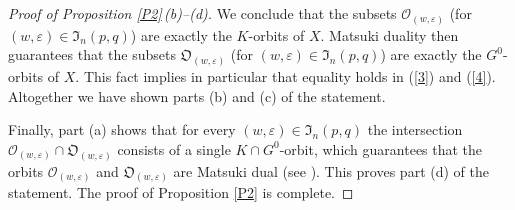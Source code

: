 \documentclass{amsart}
\theoremstyle{definition}
\begin{document}
\begin{proof}[Proof of Proposition \ref{P2}\,{\rm (b)}--{\rm (d)}]
We conclude that the subsets $\mathcal{O}_{(w,\varepsilon)}$ (for
$(w,\varepsilon)\in\mathfrak{I}_n(p,q)$) are exactly the $K$-orbits
of $X$. Matsuki duality then guarantees that the subsets
$\mathfrak{O}_{(w,\varepsilon)}$ (for
$(w,\varepsilon)\in\mathfrak{I}_n(p,q)$) are exactly the
$G^0$-orbits of $X$. This fact implies in particular that
equality holds in (\ref{3}) and (\ref{4}). Altogether we have shown
parts {\rm (b)} and {\rm (c)} of the statement.

Finally, part {\rm (a)} shows that for every
$(w,\varepsilon)\in\mathfrak{I}_n(p,q)$ the intersection
$\mathcal{O}_{(w,\varepsilon)}\cap\mathfrak{O}_{(w,\varepsilon)}$
consists of a single $K\cap G^0$-orbit, which guarantees that the
orbits $\mathcal{O}_{(w,\varepsilon)}$ and
$\mathfrak{O}_{(w,\varepsilon)}$ are Matsuki dual (see
\cite{Matsuki,Matsuki3}). This proves part {\rm (d)} of the
statement. The proof of Proposition \ref{P2} is complete.
\end{proof}
\end{document}
